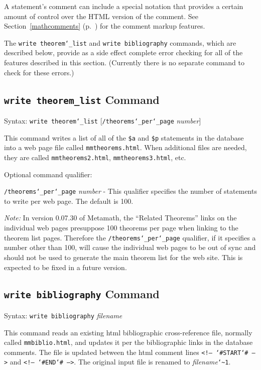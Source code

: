 A statement's comment can include a special notation that provides a
certain amount of control over the {\sc HTML} version of the comment.  See
Section~\ref{mathcomments} (p.~\pageref{htmlmkup}) for the comment
markup features.

The \texttt{write theorem{\char`\_}list} and \texttt{write bibliography}
commands, which are described below, provide as a side effect complete
error checking for all of the features described in this section.
(Currently there is no separate command to check for these
errors.)

\subsection{\texttt{write theorem\_list}
Command}
Syntax:  \texttt{write theorem{\char`\_}list}
[\texttt{/theorems{\char`\_}per{\char`\_}page} {\em number}]

This command writes a list of all of the \texttt{\$a} and \texttt{\$p}
statements in the database into a web page file
 called \texttt{mmtheorems.html}.
When additional files are needed, they are called
\texttt{mmtheorems2.html}, \texttt{mmtheorems3.html}, etc.

Optional command qualifier:

    \texttt{/theorems{\char`\_}per{\char`\_}page} {\em number} -
 This qualifier specifies the number of statements to
        write per web page.  The default is 100.

{\em Note:} In version 0.07.30 of Metamath, the ``Related Theorems'' links on the individual
web pages presuppose 100 theorems per page when linking to the theorem
list pages.  Therefore the \texttt{/theorems{\char`\_}per{\char`\_}page}
qualifier, if it specifies a number other than 100, will cause the
individual web pages to be out of sync and should not be used to
generate the main theorem list for the web site.  This is expected to be
fixed in a future version.


\subsection{\texttt{write bibliography}\label{wrbib}
Command}
Syntax:  \texttt{write bibliography} {\em filename}

This command reads an existing {\sc html} bibliographic cross-reference
file, normally called \texttt{mmbiblio.html}, and updates it per the
bibliographic links in the database comments.  The file is updated
between the {\sc html} comment lines \texttt{<!--
{\char`\#}START{\char`\#} -->} and \texttt{<!-- {\char`\#}END{\char`\#}
-->}.  The original input file is renamed to {\em
filename}\texttt{{\char`\~}1}.

